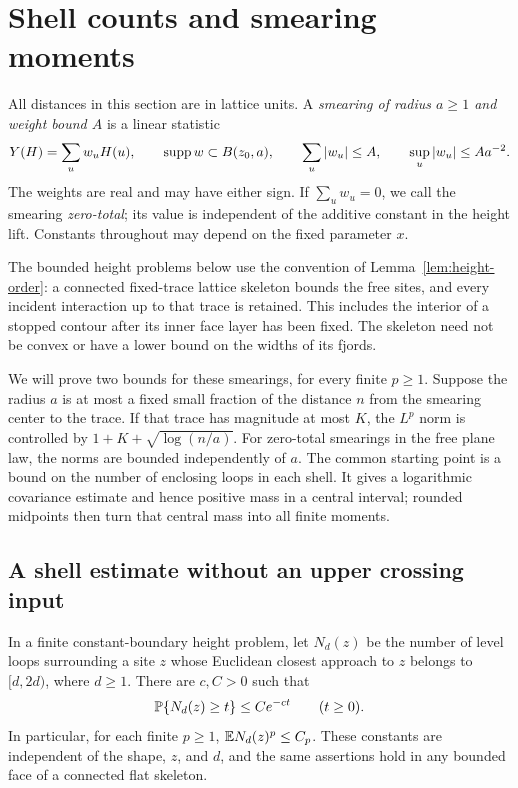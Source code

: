 \section{Shell counts and smearing moments}\label{sec:moments}

All distances in this section are in lattice units.  A \emph{smearing of
radius $a\geq1$ and weight bound $A$} is a linear statistic
\begin{equation}\label{moments:weights}
 Y(H)=\sum_u w_uH(u),\qquad
 \operatorname{supp} w\subset B(z_0,a),\qquad
 \sum_u|w_u|\leq A,\qquad \sup_u|w_u|\leq Aa^{-2}.
\end{equation}
The weights are real and may have either sign.  If $\sum_uw_u=0$, we
call the smearing \emph{zero-total}; its value is independent of the
additive constant in the height lift.  Constants throughout may depend
on the fixed parameter $x$.

The bounded height problems below use the convention of
Lemma~\ref{lem:height-order}: a connected fixed-trace lattice skeleton
bounds the free sites, and every incident interaction up to that trace
is retained.  This includes the interior of a stopped contour after its
inner face layer has been fixed.  The skeleton need not be convex or
have a lower bound on the widths of its fjords.

We will prove two bounds for these smearings, for every finite $p\geq1$.
Suppose the radius $a$ is at most a fixed small fraction of the distance
$n$ from the smearing center to the trace.  If that trace has magnitude
at most $K$, the $L^p$ norm is controlled by
$1+K+\sqrt{\log(n/a)}$.  For zero-total smearings in the free plane
law, the norms are bounded independently of $a$.  The common starting point is a bound on the
number of enclosing loops in each shell.  It gives a logarithmic
covariance estimate and hence positive mass in a central interval;
rounded midpoints then turn that central mass into all finite moments.

\subsection{A shell estimate without an upper crossing input}

\begin{lemma}\label{lem:shell-moments}
In a finite constant-boundary height problem, let $N_d(z)$ be the number
of level loops surrounding a site $z$ whose Euclidean closest approach
to $z$ belongs to $[d,2d)$, where $d\geq1$.  There are $c,C>0$ such that
\begin{equation}\label{moments:shell-tail}
 \mathbb P\{N_d(z)\geq t\}\leq Ce^{-ct}\qquad(t\geq0).
\end{equation}
In particular, for each finite $p\geq1$, $\mathbb E N_d(z)^p\leq C_p$.
These constants are independent of the shape, $z$, and $d$, and the
same assertions hold in any bounded face of a connected flat skeleton.
\end{lemma}

